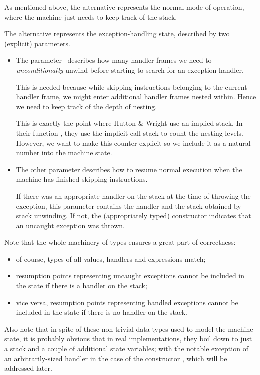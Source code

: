 \noindent As mentioned above, the alternative \ident{\tick[\_]} represents the normal mode
of operation, where the machine just needs to keep track of the stack.

The alternative \ident{$\times$[\_,\_]} represents the exception-handling state, described by
two (explicit) parameters.
\begin{itemize}
	\item The parameter~ describes how many handler frames we need to
		\emph{unconditionally} unwind before starting to search for an exception handler.
		
		This is needed because while skipping instructions belonging to the current
		handler frame, we might enter additional handler frames nested within. Hence
		we need to keep track of the depth of nesting.
		
		This is exactly the point where Hutton \& Wright use an implied stack.\cite[pg.~7]{gmh:exceptions}
		In their function , they use the implicit call stack to count
		the nesting levels. However, we want to make this counter explicit so we include
		it as a natural number into the machine state.
		
	\item The other parameter describes how to resume normal execution when
		the machine has finished skipping instructions.
		
		If there was an appropriate handler on the stack at the time of throwing
		the exception, this parameter contains the handler and the stack obtained
		by stack unwinding. If not, the (appropriately typed) constructor
		 indicates that an uncaught exception was thrown.
\end{itemize}

\noindent Note that the whole machinery of types ensures a great part of correctness:
\begin{itemize}
	\item of course, types of all values, handlers and expressions match;
	\item resumption points representing uncaught exceptions cannot be included in the state
		if there is a handler on the stack;
	\item vice versa, resumption points representing handled exceptions cannot be included
		in the state if there is no handler on the stack.
\end{itemize}

Also note that in spite of these non-trivial data types used to model the
machine state, it is probably obvious that in real implementations, they boil
down to just a stack and a couple of additional state variables; with the
notable exception of an arbitrarily-sized handler in the case of the
constructor , which will be addressed later.

